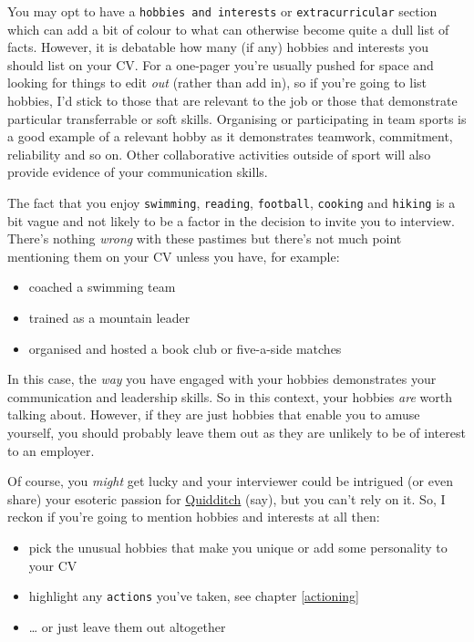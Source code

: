 \documentclass[
]{book}
\providecommand{\tightlist}{%
  \setlength{\itemsep}{0pt}\setlength{\parskip}{0pt}}
\begin{document}
You may opt to have a \texttt{hobbies\ and\ interests} or \texttt{extracurricular} section which can add a bit of colour to what can otherwise become quite a dull list of facts. However, it is debatable how many (if any) hobbies and interests you should list on your CV. For a one-pager you're usually pushed for space and looking for things to edit \emph{out} (rather than add in), so if you're going to list hobbies, I'd stick to those that are relevant to the job or those that demonstrate particular transferrable or soft skills. Organising or participating in team sports is a good example of a relevant hobby as it demonstrates teamwork, commitment, reliability and so on. Other collaborative activities outside of sport will also provide evidence of your communication skills. \citep{hobbies}

The fact that you enjoy \texttt{swimming}, \texttt{reading}, \texttt{football}, \texttt{cooking} and \texttt{hiking} is a bit vague and not likely to be a factor in the decision to invite you to interview. There's nothing \emph{wrong} with these pastimes but there's not much point mentioning them on your CV unless you have, for example:

\begin{itemize}
\tightlist
\item
  coached a swimming team
\item
  trained as a mountain leader
\item
  organised and hosted a book club or five-a-side matches
\end{itemize}

In this case, the \emph{way} you have engaged with your hobbies demonstrates your communication and leadership skills. So in this context, your hobbies \emph{are} worth talking about. However, if they are just hobbies that enable you to amuse yourself, you should probably leave them out as they are unlikely to be of interest to an employer.

Of course, you \emph{might} get lucky and your interviewer could be intrigued (or even share) your esoteric passion for \href{https://en.wikipedia.org/wiki/Quidditch_(real-life_sport)}{Quidditch} (say), but you can't rely on it. So, I reckon if you're going to mention hobbies and interests at all then:

\begin{itemize}
\tightlist
\item
  pick the unusual hobbies that make you unique or add some personality to your CV
\item
  highlight any \texttt{actions} you've taken, see chapter \ref{actioning}
\item
  \ldots{} or just leave them out altogether
\end{itemize}
\end{document}
